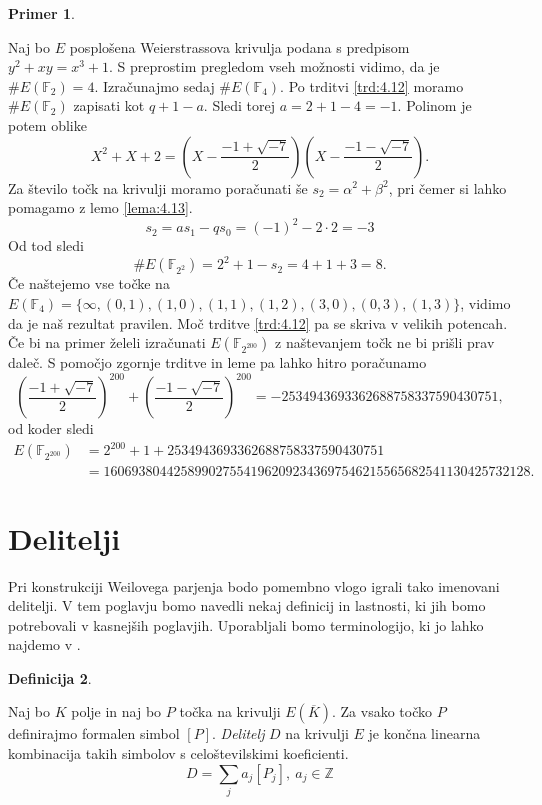 \documentclass[12pt,a4paper,twoside]{article}
\theoremstyle{definition} %
\newtheorem{definicija}{Definicija}[section]
\newtheorem{primer}[definicija]{Primer}
\theoremstyle{plain} %
\numberwithin{equation}{section}  %
\newcommand{\Z}{\mathbb Z}
\newcommand{\F}{\mathbb F}
\newcommand{\E}[1]{E({#1})}
\begin{document}
\begin{primer}~

Naj bo $E$ posplošena Weierstrassova krivulja podana s predpisom $y^2+xy = x^3+1$. S preprostim pregledom vseh možnosti vidimo, da je $\#\E{\F_2} = 4$. Izračunajmo sedaj $\#\E{\F_4}$. Po trditvi \ref{trd:4.12} moramo
$\#\E{\F_2}$ zapisati kot $q+1-a$. Sledi torej $a = 2+1-4 = -1$. Polinom je potem oblike
$$X^2+X+2 = \left( X-\frac{-1+\sqrt{-7}}{2}\right) \left(X-\frac{-1-\sqrt{-7}}{2}\right).$$
Za število točk na krivulji moramo poračunati še $s_2=\alpha^2+\beta^2$, pri čemer si lahko pomagamo z lemo \ref{lema:4.13}.
$$s_2 = as_1-qs_0 = (-1)^2-2\cdot2 = -3$$
Od tod sledi
$$\#\E{\F_{2^2}} = 2^2+1-s_2 = 4+1+3 = 8.$$
 Če naštejemo vse točke na $\E{\F_{4}} = \{ \infty,(0,1),(1,0),(1,1),(1,2),(3,0),(0,3),(1,3)\}$, vidimo da je naš rezultat pravilen.
Moč trditve \ref{trd:4.12} pa se skriva v velikih potencah. Če bi na primer želeli izračunati
$\E{\F_{2^{200}}}$ z naštevanjem točk ne bi prišli prav daleč. S pomočjo zgornje trditve in leme pa lahko hitro poračunamo
$$\left(\frac{-1+\sqrt{-7}}{2}\right)^{200}+ \left(\frac{-1-\sqrt{-7}}{2}\right)^{200} = -2534943693362688758337590430751,$$
od koder sledi
\begin{align}
\E{\F_{2^{200}}} &{}= 2^{200} + 1 +2534943693362688758337590430751 \nonumber \\
&{}= 1606938044258990275541962092343697546215565682541130425732128. \nonumber
\end{align}
\end{primer}

\newpage


\section{Delitelji}

Pri konstrukciji Weilovega parjenja bodo pomembno vlogo igrali tako imenovani delitelji. V tem poglavju bomo navedli nekaj definicij in lastnosti, ki jih bomo potrebovali v kasnejših poglavjih. Uporabljali bomo terminologijo, ki jo lahko najdemo v \cite{Washington2008}.

\begin{definicija}~

Naj bo $K$ polje in naj bo $P$ točka na krivulji $\E{\overline{K}}$. Za vsako točko $P$ definirajmo formalen simbol $[P]$. \emph{Delitelj} $D$ na krivulji $E$ je končna linearna kombinacija takih simbolov s celoštevilskimi koeficienti.
$$D = \sum_{j}a_j[P_j], \ a_j \in \Z $$

\end{definicija}
\end{document}
